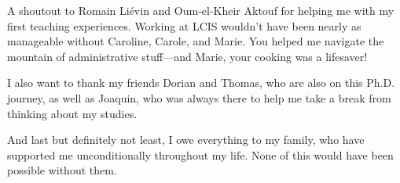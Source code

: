 A shoutout to Romain Liévin and Oum-el-Kheir Aktouf for helping me with my first teaching experiences. Working at LCIS wouldn’t have been nearly as manageable without Caroline, Carole, and Marie. You helped me navigate the mountain of administrative stuff—and Marie, your cooking was a lifesaver!

I also want to thank my friends Dorian and Thomas, who are also on this Ph.D. journey, as well as Joaquin, who was always there to help me take a break from thinking about my studies.

And last but definitely not least, I owe everything to my family, who have supported me unconditionally throughout my life. None of this would have been possible without them.


\endgroup



